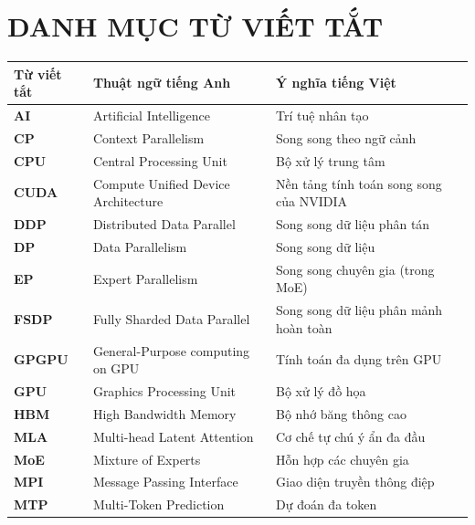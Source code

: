 \section*{DANH MỤC TỪ VIẾT TẮT}

\begin{table}[H]
    \centering
    \begin{tabularx}{\textwidth}{|l|L{0.9}|L{1.1}|}
        \hline
        \textbf{Từ viết tắt} & \textbf{Thuật ngữ tiếng Anh} & \textbf{Ý nghĩa tiếng Việt} \\
        \hline
        \textbf{AI} & Artificial Intelligence & Trí tuệ nhân tạo \\
        \hline
        \textbf{CP} & Context Parallelism & Song song theo ngữ cảnh \\
        \hline
        \textbf{CPU} & Central Processing Unit & Bộ xử lý trung tâm \\
        \hline
        \textbf{CUDA} & Compute Unified Device Architecture & Nền tảng tính toán song song của NVIDIA \\
        \hline
        \textbf{DDP} & Distributed Data Parallel & Song song dữ liệu phân tán \\
        \hline
        \textbf{DP} & Data Parallelism & Song song dữ liệu \\
        \hline
        \textbf{EP} & Expert Parallelism & Song song chuyên gia (trong MoE) \\
        \hline
        \textbf{FSDP} & Fully Sharded Data Parallel & Song song dữ liệu phân mảnh hoàn toàn \\
        \hline
        \textbf{GPGPU} & General-Purpose computing on GPU & Tính toán đa dụng trên GPU \\
        \hline
        \textbf{GPU} & Graphics Processing Unit & Bộ xử lý đồ họa \\
        \hline
        \textbf{HBM} & High Bandwidth Memory & Bộ nhớ băng thông cao \\
        \hline
        \textbf{MLA} & Multi-head Latent Attention & Cơ chế tự chú ý ẩn đa đầu \\
        \hline
        \textbf{MoE} & Mixture of Experts & Hỗn hợp các chuyên gia \\
        \hline
        \textbf{MPI} & Message Passing Interface & Giao diện truyền thông điệp \\
        \hline
        \textbf{MTP} & Multi-Token Prediction & Dự đoán đa token \\

\end{tabularx}
\end{table}
